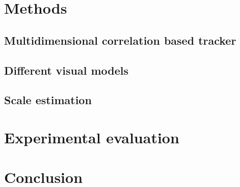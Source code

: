 \documentclass[runningheads]{llncs}
\begin{document}
\section{Methods}
\label{sec:methods}

\subsection{Multidimensional correlation based tracker}

\subsection{Different visual models}

\subsection{Scale estimation}

\section{Experimental evaluation}
\label{sec:experimental_evaluation}

\section{Conclusion}



\end{document}

